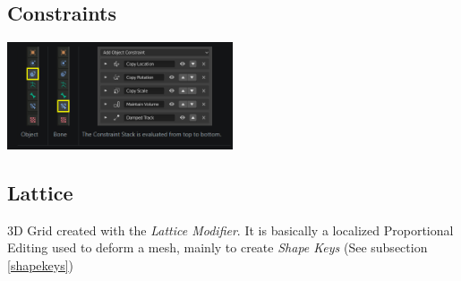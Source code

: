 \documentclass{article}
\begin{document}
\subsection{Constraints}\label{constraints}
\begin{center}
    \includegraphics[width=0.5\textwidth]{blender_docs_images/my_constraint_stack.png}
\end{center}

\subsection{Lattice}
3D Grid created with the \textit{Lattice Modifier}. It is basically a localized Proportional Editing used to deform a mesh, mainly to create \textit{Shape Keys} (See subsection \ref{shapekeys})
\end{document}
